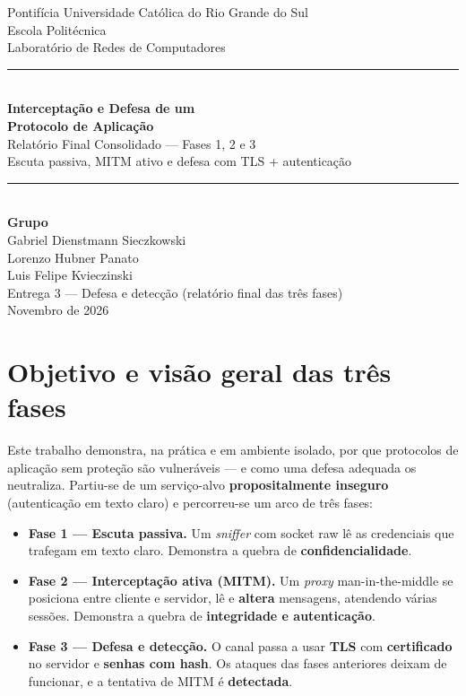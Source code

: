 \documentclass[11pt,a4paper]{article}
\begin{document}
\begin{titlepage}
\centering
\vspace*{1.5cm}
{\large Pontifícia Universidade Católica do Rio Grande do Sul}\\[0.2cm]
{\large Escola Politécnica}\\[0.2cm]
{\large Laboratório de Redes de Computadores}\\[2.5cm]

\rule{\linewidth}{0.5mm}\\[0.5cm]
{\huge \bfseries Interceptação e Defesa de um\\ Protocolo de Aplicação}\\[0.4cm]
{\Large Relatório Final Consolidado — Fases 1, 2 e 3}\\[0.3cm]
{\large Escuta passiva, MITM ativo e defesa com TLS + autenticação}\\
\rule{\linewidth}{0.5mm}\\[1.5cm]

{\large\bfseries Grupo}\\[0.3cm]
{\large
Gabriel Dienstmann Sieczkowski\\
Lorenzo Hubner Panato\\
Luis Felipe Kvieczinski\\
}
\vfill
{\large Entrega 3 — Defesa e detecção (relatório final das três fases)}\\[0.3cm]
{\large Novembro de 2026}
\end{titlepage}

\tableofcontents
\newpage

\section{Objetivo e visão geral das três fases}

Este trabalho demonstra, na prática e em ambiente isolado, por que protocolos de
aplicação sem proteção são vulneráveis — e como uma defesa adequada os
neutraliza. Partiu-se de um serviço-alvo \textbf{propositalmente inseguro}
(autenticação em texto claro) e percorreu-se um arco de três fases:

\begin{itemize}[leftmargin=1.4em]
  \item \textbf{Fase 1 — Escuta passiva.} Um \textit{sniffer} com socket raw lê
  as credenciais que trafegam em texto claro. Demonstra a quebra de
  \textbf{confidencialidade}.
  \item \textbf{Fase 2 — Interceptação ativa (MITM).} Um \textit{proxy}
  man-in-the-middle se posiciona entre cliente e servidor, lê e \textbf{altera}
  mensagens, atendendo várias sessões. Demonstra a quebra de \textbf{integridade
  e autenticação}.
  \item \textbf{Fase 3 — Defesa e detecção.} O canal passa a usar \textbf{TLS}
  com \textbf{certificado} no servidor e \textbf{senhas com hash}. Os ataques das
  fases anteriores deixam de funcionar, e a tentativa de MITM é \textbf{detectada}.
\end{itemize}
\end{document}
